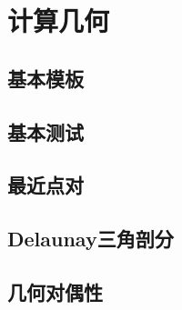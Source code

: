 \section{计算几何}
\subsection{基本模板}


\subsection{基本测试}


\subsection{最近点对}


\subsection{Delaunay三角剖分}


\subsection{几何对偶性}

